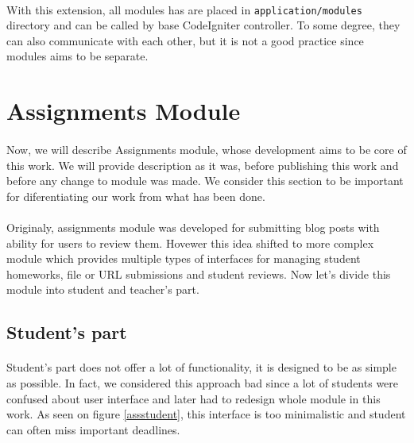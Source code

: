 \paragraph{}
With this extension, all modules has are placed in \texttt{application/modules} directory and can be called by base CodeIgniter controller. To some degree, they can also communicate with each other, but it is not a good practice since modules aims to be separate.

\section{Assignments Module}
\paragraph{}
Now, we will describe Assignments module, whose development aims to be core of this work. We will provide description as it was, before publishing this work and before any change to module was made. We consider this section to be important for diferentiating our work from what has been done.

\paragraph{}
Originaly, assignments module was developed for submitting blog posts with ability for users to review them. Hovewer this idea shifted to more complex module which provides multiple types of interfaces for managing student homeworks, file or URL submissions and student reviews. Now let's divide this module into student and teacher's part.

\subsection{Student's part}
\paragraph{}
Student's part does not offer a lot of functionality, it is designed to be as simple as possible. In fact, we considered this approach bad since a lot of students were confused about user interface and later had to redesign whole module in this work. As seen on figure \ref{assstudent}, this interface is too minimalistic and student can often miss important deadlines.

